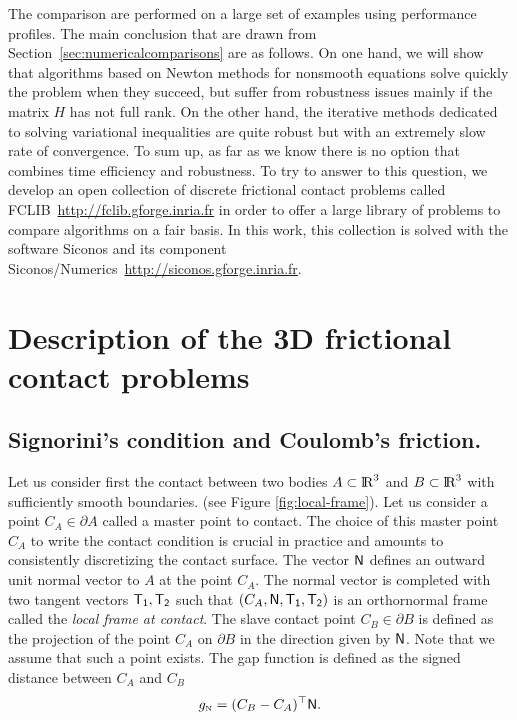 The comparison are performed on a large set of examples using performance profiles. The main conclusion that are drawn from Section~\ref{sec:numericalcomparisons} are as follows.
On one hand, we will show that algorithms based on Newton methods for nonsmooth equations solve quickly the problem when they succeed, but suffer from robustness issues mainly if the matrix $H$ has not full rank. On the other hand, the
iterative methods dedicated to solving variational inequalities are quite robust but with an extremely slow rate of convergence. To sum up, as far as we know there is no option that combines time efficiency and robustness. To try to answer to this question, we develop an open collection of discrete frictional contact problems called FCLIB~\url{http://fclib.gforge.inria.fr} in order to offer a large library of problems to compare algorithms on a fair basis.  In this work, this collection is solved with the software {\sc Siconos} and its component {\sc Siconos/Numerics}~\url{http://siconos.gforge.inria.fr}\citep{Acary.Bremond.Huber.Perignon2015}.


\clearpage
\section{Description of the 3D frictional contact problems}
\label{sec:description}
\subsection{Signorini's condition and Coulomb's friction.}

Let us consider first the contact between two  bodies $A \subset  \mbox{l\hspace{ -.15em}R}^3$ and $B \subset \mbox{l\hspace{ -.15em}R}^3$ with sufficiently smooth boundaries. (see Figure \ref{fig:local-frame}). Let us consider a point $C_{A} \in \partial A$ called a master point to contact.  The choice of this master point $C_A$ to write the contact condition is crucial in  practice and amounts to consistently discretizing  the contact surface. The vector  ${\sf N}$ defines an outward unit normal vector to $A$ at the point $C_A$. The normal vector is completed with two tangent vectors $\sf T_1, T_2$ such that $(C_A, \sf N, T_1, T_2)$ is an orthornormal frame called the \textit{local frame at contact}. The slave contact point $C_B \in \partial B$ is defined as the projection of the point $C_A$ on $\partial B$ in the direction given by $\sf N$. Note that we assume that such a point exists. The gap function is defined as the signed distance between $C_A$ and $C_B$
\begin{equation}
  \label{eq:gap}
  g_{\n} = (C_B-C_A)^\top  \sf N.
\end{equation}


